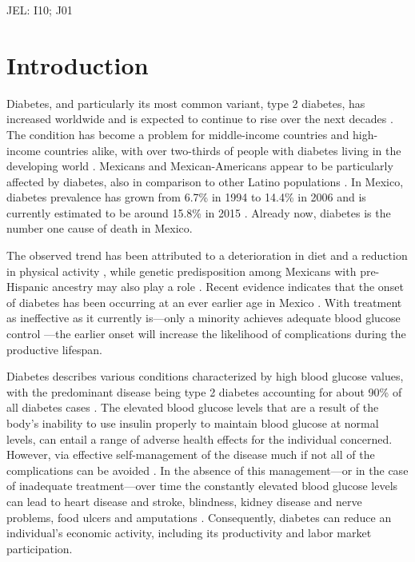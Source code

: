 \documentclass[12pt,english]{article}
\begin{document}
JEL: I10; J01


\section{\label{sec:Introduction4}Introduction }

Diabetes, and particularly its most common variant, type 2 diabetes, has increased worldwide and is expected to continue to rise over the next decades \parencite{Risk2016}. The condition has become a problem for middle-income countries and high-income countries alike, with over two-thirds of people with diabetes living in the developing world \parencite{InternationalDiabetesFederation2015}. Mexicans and Mexican-Americans appear to be particularly affected by diabetes, also in comparison to other Latino populations \parencite{Schneiderman2014}. In Mexico, diabetes prevalence has grown from 6.7\% in 1994 to 14.4\% in 2006 \parencite{Barquera2013} and is currently estimated to be around 15.8\% in 2015 \parencite{InternationalDiabetesFederation2015}. Already now, diabetes is the number one cause of death in Mexico. 

The observed trend has been attributed to a deterioration in diet and a reduction in physical activity \parencite{Barquera2008b,Basu2013}, while genetic predisposition among Mexicans with pre-Hispanic ancestry may also play a role \parencite{Williams2013}. Recent evidence indicates that the onset of diabetes has been occurring at an ever earlier age in Mexico \parencite{Bello-Chavolla2017a}. With treatment as ineffective as it currently is---only a minority achieves adequate blood glucose control \parencite{Barquera2013}---the earlier onset will increase the likelihood of complications during the productive lifespan. 

Diabetes describes various conditions characterized by high blood glucose values, with the predominant disease being type 2 diabetes accounting for about 90\% of all diabetes cases \parencite{Sicree2009}. The elevated
blood glucose levels that are a result of the body's inability to use insulin properly to maintain blood glucose at normal levels, can entail a range of adverse health effects for the individual concerned. However, via effective self-management of the disease much if not all of the complications can be avoided \parencite{Lim2011, Gregg2012}. In the absence of this management---or in the case of inadequate treatment---over time the constantly elevated blood glucose levels can lead to heart disease and stroke, blindness, kidney disease and nerve problems, food ulcers and amputations \parencite{Reynoso-Noveron2011}. Consequently, diabetes can reduce an individual's economic activity, including its productivity and labor market participation.
\end{document}
